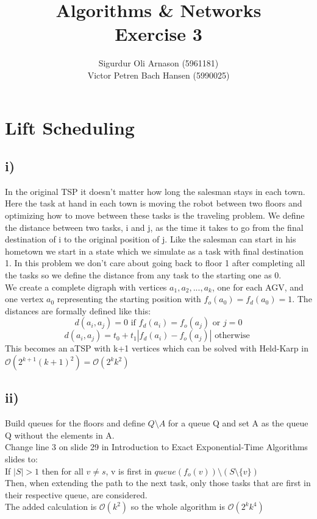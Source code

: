 \documentclass[a4paper]{article}
\author{Sigurdur Oli Arnason (5961181) \\ Victor Petren Bach Hansen (5990025)}
\title{Algorithms \& Networks \\ Exercise 3}
\begin{document}
\maketitle
\section{Lift Scheduling}

\subsection*{i)}
In the original TSP it doesn't matter how long the salesman stays in each town. Here the task at hand in each town is moving the robot between two floors and optimizing how to move between these tasks is the traveling problem. We define the distance between two tasks, i and j, as the time it takes to go from the final destination of i to the original position of j. Like the salesman can start in his hometown we start in a state which we simulate as a task with final destination 1. In this problem we don't care about going back to floor 1 after completing all the tasks so we define the distance from any task to the starting one as 0. \\
We create a complete digraph with vertices $a_1, a_2, ..., a_k$, one for each AGV, and one vertex $a_0$ representing the starting position with $f_o(a_0) = f_d(a_0) = 1$. The distances are formally defined like this: \\
\[
d(a_i, a_j) = 0 \textrm{ if } f_d(a_i) = f_o(a_j) \textrm{ or } j = 0
\]
\[
d(a_i, a_j) = t_0 + t_1|f_d(a_i) - f_o(a_j)| \textrm{ otherwise }
\]
This becomes an aTSP with k+1 vertices which can be solved with Held-Karp in $\mathcal{O}(2^{k+1}(k+1)^2)=\mathcal{O}(2^{k}k^2)$

\subsection*{ii)}
Build queues for the floors and define $Q\setminus A$ for a queue Q and set A as the queue Q without the elements in A. \\
Change line 3 on slide 29 in Introduction to Exact Exponential-Time Algorithms slides to:\\
If $|S|>1$ then for all $v \neq s$, v is first in $queue(f_o(v))\setminus(S \setminus \{v\})$ \\
Then, when extending the path to the next task, only those tasks that are first in their respective queue, are considered. \\
The added calculation is $\mathcal{O}(k^2)$ so the whole algorithm is $\mathcal{O}(2^{k}k^4)$
\end{document}
